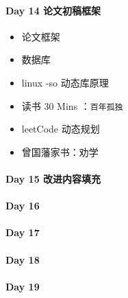 \documentclass[UTF8,a4paper,8pt]{ctexart}
\begin{document}
	 	 
 	 \paragraph{Day 14  论文初稿框架    \quad     }
	 	 \begin{itemize}[itemindent = 1em]
	 	 	\renewcommand\labelitemi{\makebox[0pt][l]{$\square$}\hspace{1em}} 
	 	 	\renewcommand\labelitemi{\makebox[0pt][l]{$\square$}\raisebox{.15ex}{\hspace{0.1em}$\checkmark$}}	
	 	 	\item   论文框架	
	 	 	\item 	数据库
	 	 	\item   linux -so 动态库原理
	 	 	
	 	 	\item   读书  30 Mins	：\verb|百年孤独|
	 	 	\item   leetCode 动态规划
	 	 	
	 	 	\renewcommand\labelitemi{\makebox[0pt][l]{$\square$}\hspace{1em}}
	 	 	\item  曾国藩家书：劝学
	 	 \end{itemize}
 	 \paragraph{Day 15  改进内容填充    \quad     }
 	 \paragraph{Day 16      \quad     }
 	 \paragraph{Day 17      \quad     }
 	 \paragraph{Day 18      \quad     }
 	 \paragraph{Day 19      \quad     }
\end{document}
